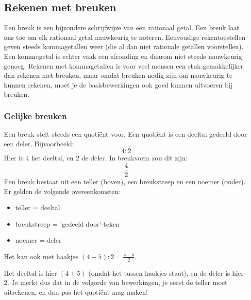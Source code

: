 \subsection{Rekenen met breuken}

Een breuk is een bijzondere schrijfwijze van een rationaal getal. Een breuk laat ons toe om elk rationaal getal nauwkeurig te noteren. Eenvoudige rekentoestellen geven steeds kommagetallen weer (die al dan niet rationale getallen voorstellen). Een kommagetal is echter vaak een afronding en daarom niet steeds nauwkeurig genoeg. Rekenen met kommagetallen is voor veel mensen een stuk gemakkelijker dan rekenen met breuken, maar omdat breuken nodig zijn om nauwkeurig te kunnen rekenen, moet je de basisbewerkingen ook goed kunnen uitvoeren bij breuken.

\subsubsection{Gelijke breuken}


Een breuk stelt steeds een quoti\"ent voor. Een quoti\"ent is een deeltal gedeeld door een deler. Bijvoorbeeld:
\begin{equation*}
4:2
\end{equation*}
Hier is $4$ het deeltal, en $2$ de deler. In breukvorm zou dit zijn:
\begin{equation*}
\frac{4}{2}
\end{equation*}
Een breuk bestaat uit een teller (boven), een breukstreep en een noemer (onder). Er gelden de volgende overeenkomsten:

\begin{itemize}
	\item teller = deeltal
	\item breukstreep = 'gedeeld door'-teken
	\item noemer = deler
\end{itemize}
Het kan ook met haakjes $(4+5):2=\frac{4+5}{2}$.

Het deeltal is hier $(4+5)$ (omdat het tussen haakjes staat), en de deler is hier $2$. Je merkt dus dat in de volgorde van bewerkingen, je eerst de teller moet uitrekenen, en dan pas het quoti\"ent mag maken!

